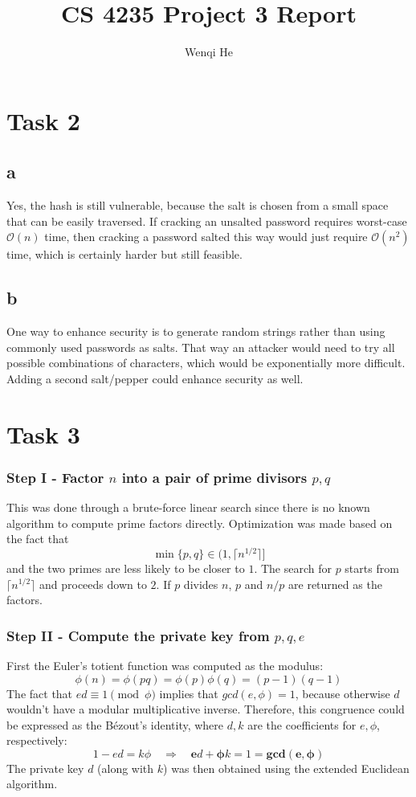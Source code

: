 \documentclass[12pt]{article}
\title{CS 4235 Project 3 Report}
\author{Wenqi He}
\begin{document}
\maketitle
\section*{Task 2}
\subsection*{a}
Yes, the hash is still vulnerable, because the salt is chosen from a small space that can be easily traversed. If cracking an unsalted password requires worst-case $\mathcal{O}(n)$ time, then cracking a password salted this way would just require $\mathcal{O}(n^2)$ time, which is certainly harder but still feasible.
\subsection*{b}
One way to enhance security is to generate random strings rather than using commonly used passwords as salts. That way an attacker would need to try all possible combinations of characters, which would be exponentially more difficult. Adding a second salt/pepper could enhance security as well.
\section*{Task 3}
\subsubsection*{Step I - Factor $n$ into a pair of prime divisors $p, q$} This was done through a brute-force linear search since there is no known algorithm to compute prime factors directly. Optimization was made based on the fact that
\[ \min\{p,q\} \in \big(1, \lceil n^{1/2} \rceil\big]\]
and the two primes are less likely to be closer to $1$. The search for $p$ starts from $\lceil n^{1/2} \rceil$ and proceeds down to $2$. If $p$ divides $n$, $p$ and $n/p$ are returned as the factors.
\subsubsection*{Step II - Compute the private key from $p,q,e$} First the Euler's totient function was computed as the modulus:
\[ \phi(n) = \phi(pq) = \phi(p)\phi(q) = (p-1)(q-1) \]
The fact that $ed \equiv 1 \pmod{\phi}$ implies that $gcd(e,\phi) =1$, because otherwise $d$ wouldn't have a modular multiplicative inverse. Therefore, this congruence could be expressed as the Bézout's identity, where $d, k$ are the coefficients for $e, \phi$, respectively:
\[ 1 - ed = k\phi \quad\Rightarrow\quad \bm{e}d + \bm{\phi}k = 1 = \bm{gcd(e,\phi)} \]
The private key $d$ (along with $k$) was then obtained using the extended Euclidean algorithm.
\end{document}
